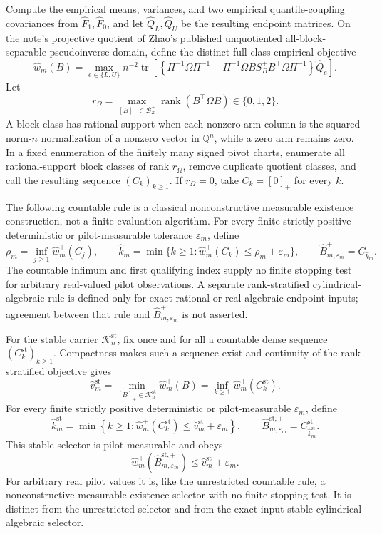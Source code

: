 Compute the empirical means, variances, and two empirical quantile-coupling covariances from \(\widehat F_1,\widehat F_0\), and let \(\widehat Q_L,\widehat Q_U\) be the resulting endpoint matrices.  On the note's projective quotient of Zhao's published unquotiented all-block-separable pseudoinverse domain, define the distinct full-class empirical objective
\[
\widehat w_m^+(B)=
\max_{e\in\{L,U\}}n^{-2}\operatorname{tr}\!\left[
\left\{\Pi^{-1}\Omega\Pi^{-1}
-\Pi^{-1}\Omega B S_B^+B^{\top}\Omega\Pi^{-1}\right\}\widehat Q_e
\right].
\]
Let
\[
r_\Omega=\max_{[B]_+\in\mathcal B_Z^+}\operatorname{rank}(B^{\top}\Omega B)\in\{0,1,2\}.
\]
A block class has rational support when each nonzero arm column is the squared-norm-\(n\) normalization of a nonzero vector in \(\mathbb Q^n\), while a zero arm remains zero.  In a fixed enumeration of the finitely many signed pivot charts, enumerate all rational-support block classes of rank \(r_\Omega\), remove duplicate quotient classes, and call the resulting sequence \((C_k)_{k\ge1}\).  If \(r_\Omega=0\), take \(C_k=[0]_+\) for every \(k\).

The following countable rule is a classical nonconstructive measurable existence construction, not a finite evaluation algorithm.  For every finite strictly positive deterministic or pilot-measurable tolerance \(\varepsilon_m\), define
\[
 \rho_m=\inf_{j\ge1}\widehat w_m^+(C_j),
 \qquad
 \widehat k_m=
 \min\{k\ge1:\widehat w_m^+(C_k)\le\rho_m+\varepsilon_m\},
 \qquad
 \widehat B_{m,\varepsilon_m}^+=C_{\widehat k_m}.
\]
The countable infimum and first qualifying index supply no finite stopping test for arbitrary real-valued pilot observations.  A separate rank-stratified cylindrical-algebraic rule is defined only for exact rational or real-algebraic endpoint inputs; agreement between that rule and \(\widehat B_{m,\varepsilon_m}^+\) is not asserted.

For the stable carrier \(\mathcal K_n^{\mathrm{st}}\), fix once and for all a countable dense sequence \((C_k^{\mathrm{st}})_{k\ge1}\).  Compactness makes such a sequence exist and continuity of the rank-stratified objective gives
\[
\widehat v_m^{\mathrm{st}}
=\min_{[B]_+\in\mathcal K_n^{\mathrm{st}}}\widehat w_m^+(B)
=\inf_{k\ge1}\widehat w_m^+(C_k^{\mathrm{st}}).
\]
For every finite strictly positive deterministic or pilot-measurable \(\varepsilon_m\), define
\[
\widehat k_m^{\mathrm{st}}
=\min\left\{k\ge1:
\widehat w_m^+(C_k^{\mathrm{st}})
\le\widehat v_m^{\mathrm{st}}+\varepsilon_m\right\},
\qquad
\widehat B_{m,\varepsilon_m}^{\mathrm{st},+}
=C_{\widehat k_m^{\mathrm{st}}}^{\mathrm{st}}.
\]
This stable selector is pilot measurable and obeys
\[
\widehat w_m^+(\widehat B_{m,\varepsilon_m}^{\mathrm{st},+})
\le\widehat v_m^{\mathrm{st}}+\varepsilon_m.
\]
For arbitrary real pilot values it is, like the unrestricted countable rule, a nonconstructive measurable existence selector with no finite stopping test.  It is distinct from the unrestricted selector and from the exact-input stable cylindrical-algebraic selector.

